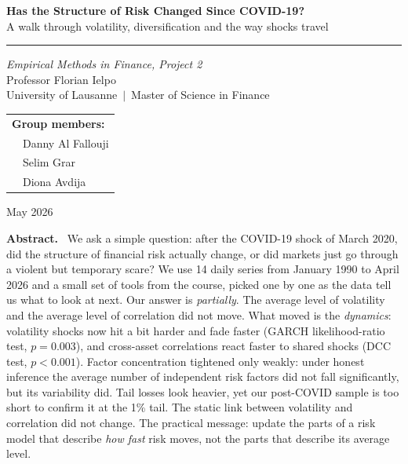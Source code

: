 \documentclass[11pt,a4paper]{article}
\begin{document}
% 

\begin{titlepage}
\centering
\vspace*{1.5cm}

{\LARGE\bfseries Has the Structure of Risk Changed Since COVID-19?}\\[0.6em]
{\large A walk through volatility, diversification and the way shocks travel}

\vspace{1.2cm}
\rule{0.7\textwidth}{0.5pt}
\vspace{0.8cm}

{\large\textit{Empirical Methods in Finance, Project 2}}\\[0.3em]
{\normalsize Professor Florian Ielpo}\\[0.2em]
{\normalsize University of Lausanne~$\mid$~Master of Science in Finance}

\vspace{1.2cm}

{\normalsize
\begin{tabular}{ll}
\multicolumn{2}{l}{\textbf{Group members:}}\\[4pt]
& Danny Al Fallouji\\
& Selim Grar\\
& Diona Avdija\\
\end{tabular}}

\vspace{1.2cm}
{\normalsize May 2026}

\vspace{1.5cm}

\begin{minipage}{0.9\textwidth}
\small
\textbf{Abstract.}~
We ask a simple question: after the COVID-19 shock of March 2020, did the structure of financial risk
actually change, or did markets just go through a violent but temporary scare? We use 14 daily series
from January 1990 to April 2026 and a small set of tools from the course, picked one by one as the data
tell us what to look at next. Our answer is \emph{partially}. The average level of volatility and the
average level of correlation did not move. What moved is the \emph{dynamics}: volatility shocks now hit
a bit harder and fade faster (GARCH likelihood-ratio test, $p=0.003$), and cross-asset correlations
react faster to shared shocks (DCC test, $p<0.001$). Factor concentration tightened only weakly: under
honest inference the average number of independent risk factors did not fall significantly, but its
variability did. Tail losses look heavier, yet our post-COVID sample is too short to confirm it at the
1\% tail. The static link between volatility and correlation did not change. The practical message: update
the parts of a risk model that describe \emph{how fast} risk moves, not the parts that describe its
average level.
\end{minipage}

\end{titlepage}
\end{document}
